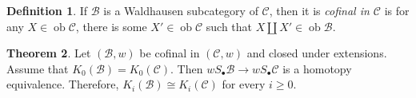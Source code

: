 \documentclass[10pt,letterpaper,cm]{nupset}
\theoremstyle{definition}
\newtheorem{definition}{Definition}
\theoremstyle{theorem}
\newtheorem{theorem}[definition]{Theorem}
\theoremstyle{remark}
\newcommand{\1}{\mathbf{1}}
\renewcommand{\b}{\mathscr{B}}
\renewcommand{\c}{\mathscr{C}}
\newcommand{\0}{\vec 0}
\DeclareMathOperator{\ob}{ob}
\begin{document}
\begin{definition}
If $\b$ is a Waldhausen subcategory of $\c$, then it is \textit{cofinal in $\c$} is for any $X \in \ob \c$, there is some $X' \in \ob \c$ such that $X \coprod X' \in \ob \b$.
\end{definition}

\begin{theorem}
Let $(\b, w)$ be cofinal in $(\c, w)$ and closed under extensions. Assume that $K_0(\b) = K_0(\c)$. Then $wS_{\bullet}\b \to wS_{\bullet}\c$ is a homotopy equivalence. Therefore, $K_i(\b) \cong K_i(\c)$ for every $i\geq 0$.
\end{theorem}
\end{document}
